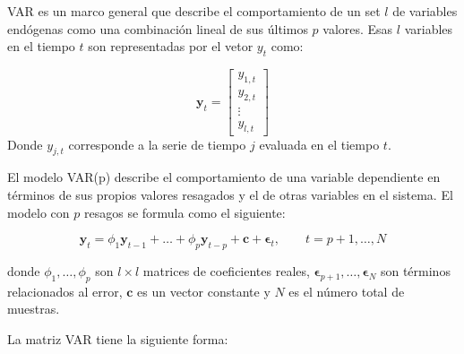 VAR es un marco general que describe el comportamiento de un set $l$ de
variables endógenas como una combinación lineal de sus últimos $p$ valores.
Esas $l$ variables en el tiempo $t$ son representadas por el vetor $y_t$ como:

\begin{equation}
\label{eq:variables}
\mathbf{y}_t = 
\begin{bmatrix} y_{1,t} \\
y_{2,t} \\
\vdots \\
y_{l,t}
\end{bmatrix}
\end{equation}
\noindent Donde $y_{j,t}$ corresponde a la serie de tiempo $j$ evaluada en el
tiempo $t$.

El modelo VAR(p) describe el comportamiento de una variable dependiente en
términos de sus propios valores resagados y el de otras variables en el
sistema. El modelo con $p$ resagos se formula como el siguiente:

\begin{equation}
\label{eq:var}
 \mathbf{y}_t = \phi_1 \mathbf{y}_{t-1}  + \dots +   \phi_p\mathbf{y}_{t-p}
 + \mathbf{c} + \mathbf{\epsilon}_t, \qquad t=p+1, \dots, N
 \end{equation}

\noindent donde ${\phi_1,\dots,\phi_p}$ son $l \times l$ matrices de
coeficientes reales, $\mathbf{\epsilon}_{p+1},\dots,\mathbf{\epsilon}_N$ son
términos relacionados al error, $\mathbf{c}$ es un vector constante y $N$ es el
número total de muestras.

La matriz VAR tiene la siguiente forma:

